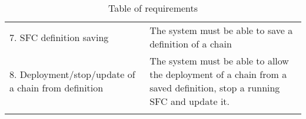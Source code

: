 \begin{longtable}[c]{p{}p{}}
7. SFC definition saving                                                & The system must be able to save a definition of a chain                                                                                                                                        \\
8. Deployment/stop/update of a chain from definition                    & The system must be able to allow the deployment of a chain from a saved definition, stop a running SFC and update it.                                                                          \\ \hline
\caption{Table of requirements}
\label{chap:prjan:tab:req}\\
\end{longtable}
